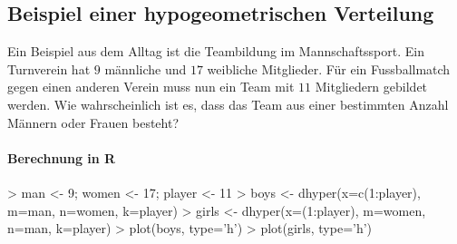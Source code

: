 \clearpage

\subsection{Beispiel einer hypogeometrischen Verteilung}
Ein Beispiel aus dem Alltag ist die Teambildung im Mannschaftssport.
Ein Turnverein hat $9$ männliche und $17$ weibliche Mitglieder. Für ein
Fussballmatch gegen einen anderen Verein muss nun ein Team mit $11$
Mitgliedern gebildet werden. Wie wahrscheinlich ist es, dass das
Team aus einer bestimmten Anzahl Männern oder Frauen besteht?
\paragraph{Berechnung in R}
\begin{Schunk}
\begin{Sinput}
> man <- 9; women <- 17; player <- 11
> boys <- dhyper(x=c(1:player), m=man, n=women, k=player)
> girls <- dhyper(x=(1:player), m=women, n=man, k=player)
> plot(boys, type='h')
> plot(girls, type='h')
\end{Sinput}
\end{Schunk}
